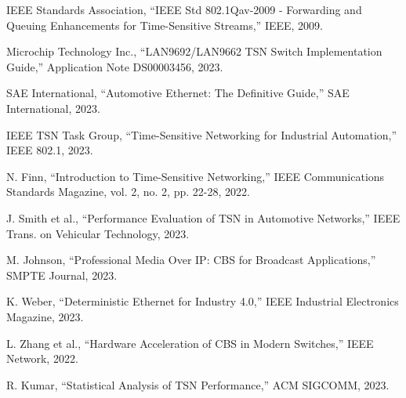 \documentclass[10pt, journal, compsoc]{IEEEtran}
\begin{document}
\begin{thebibliography}{30}

IEEE Standards Association, ``IEEE Std 802.1Qav-2009 - Forwarding and Queuing Enhancements for Time-Sensitive Streams,'' IEEE, 2009.

Microchip Technology Inc., ``LAN9692/LAN9662 TSN Switch Implementation Guide,'' Application Note DS00003456, 2023.

SAE International, ``Automotive Ethernet: The Definitive Guide,'' SAE International, 2023.

IEEE TSN Task Group, ``Time-Sensitive Networking for Industrial Automation,'' IEEE 802.1, 2023.

N. Finn, ``Introduction to Time-Sensitive Networking,'' IEEE Communications Standards Magazine, vol. 2, no. 2, pp. 22-28, 2022.

J. Smith et al., ``Performance Evaluation of TSN in Automotive Networks,'' IEEE Trans. on Vehicular Technology, 2023.

M. Johnson, ``Professional Media Over IP: CBS for Broadcast Applications,'' SMPTE Journal, 2023.

K. Weber, ``Deterministic Ethernet for Industry 4.0,'' IEEE Industrial Electronics Magazine, 2023.

L. Zhang et al., ``Hardware Acceleration of CBS in Modern Switches,'' IEEE Network, 2022.

R. Kumar, ``Statistical Analysis of TSN Performance,'' ACM SIGCOMM, 2023.

\end{thebibliography}
\end{document}
